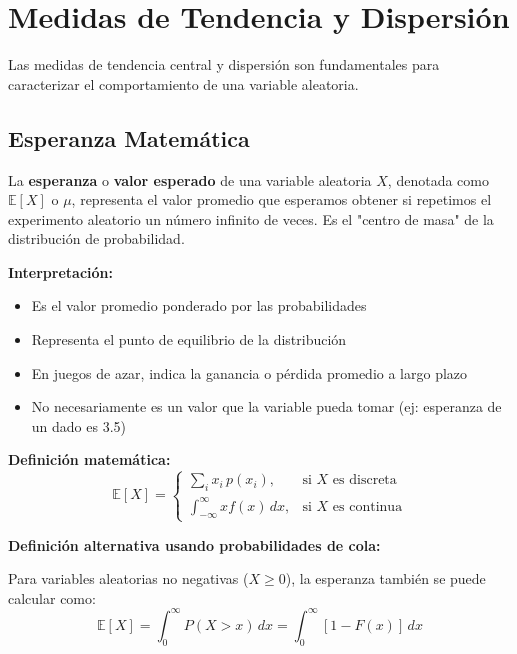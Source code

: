 \documentclass[12pt,a4paper]{article}
\begin{document}
\section{Medidas de Tendencia y Dispersión}

Las medidas de tendencia central y dispersión son fundamentales para caracterizar el comportamiento de una variable aleatoria.

\subsection{Esperanza Matemática}

La \textbf{esperanza} o \textbf{valor esperado} de una variable aleatoria $X$, denotada como $\mathbb{E}[X]$ o $\mu$, representa el valor promedio que esperamos obtener si repetimos el experimento aleatorio un número infinito de veces. Es el "centro de masa" de la distribución de probabilidad.

\textbf{Interpretación:}
\begin{itemize}
    \item Es el valor promedio ponderado por las probabilidades
    \item Representa el punto de equilibrio de la distribución
    \item En juegos de azar, indica la ganancia o pérdida promedio a largo plazo
    \item No necesariamente es un valor que la variable pueda tomar (ej: esperanza de un dado es 3.5)
\end{itemize}

\textbf{Definición matemática:}
\begin{equation}
        \mathbb{E}[X] = \begin{cases}
            \sum_i x_i \, p(x_i), & \text{si $X$ es discreta} \\
            \int_{-\infty}^{\infty} x f(x)\, dx, & \text{si $X$ es continua}
        \end{cases}
    \end{equation}
    
    \textbf{Definición alternativa usando probabilidades de cola:}
    
    Para variables aleatorias no negativas ($X \geq 0$), la esperanza también se puede calcular como:
    \begin{equation}
        \mathbb{E}[X] = \int_0^{\infty} P(X > x)\, dx = \int_0^{\infty} [1 - F(x)]\, dx
    \end{equation}
    
\end{document}
